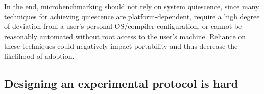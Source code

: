 \documentclass[conference]{IEEEtran}
\begin{document}

In the end, microbenchmarking should not rely on system quiescence, since many techniques
for achieving quiescence are platform-dependent, require a high degree of deviation from
a user's personal OS/compiler configuration, or cannot be reasonably automated without
root access to the user's machine. Reliance on these techniques could negatively impact
portability and thus decrease the likelihood of adoption.

\subsection{Designing an experimental protocol is hard}

\end{document}
